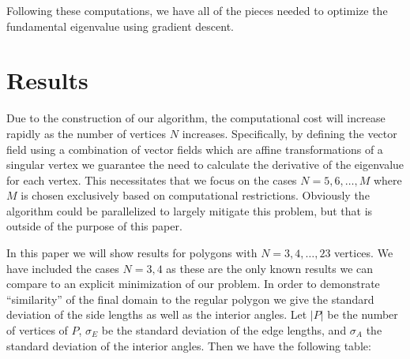 \documentclass[12pt]{report}
\numberwithin{definition}{section}
\begin{document}
Following these computations, we have all of the pieces needed to optimize the fundamental eigenvalue using gradient descent.

\break

\section{Results}

Due to the construction of our algorithm, the computational cost will increase rapidly as the number of vertices $N$ increases.
Specifically, by defining the vector field using a combination of vector fields which are affine transformations of a singular vertex we guarantee the need to calculate the derivative of the eigenvalue for each vertex.
This necessitates that we focus on the cases $N=5,6,\ldots,M$ where $M$ is chosen exclusively based on computational restrictions.
Obviously the algorithm could be parallelized to largely mitigate this problem, but that is outside of the purpose of this paper.



In this paper we will show results for polygons with $N=3,4,\ldots,23$ vertices.
We have included the cases $N=3,4$ as these are the only known results we can compare to an explicit minimization of our problem.
In order to demonstrate ``similarity'' of the final domain to the regular polygon we give the standard deviation of the side lengths as well as the interior angles.
Let $| P |$ be the number of vertices of $P$, $\sigma_{E}$ be the standard deviation of the edge lengths, and $\sigma_{A}$ the standard deviation of the interior angles.
Then we have the following table:
\end{document}
